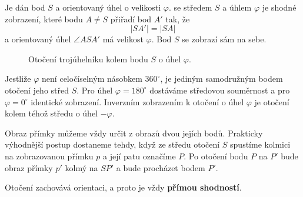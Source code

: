 \documentclass[12pt,a4paper]{article}
\begin{document}
\begin{definitionbox}
    Je dán bod $S$ a orientovaný úhel o velikosti $\varphi$.  se středem $S$ a úhlem $\varphi$ je shodné zobrazení, které bodu $A\neq S$ přiřadí bod $A'$ tak, že
    \[
        |SA'|=|SA|
    \]
    a orientovaný úhel $\angle ASA'$ má velikost $\varphi$. Bod $S$ se zobrazí sám na sebe.
\end{definitionbox}

\begin{figure}[ht]
    \centering
    \caption{Otočení trojúhelníku kolem bodu $S$ o úhel $\varphi$.}
\end{figure}

Jestliže $\varphi$ není celočíselným násobkem $360^\circ$, je jediným samodružným bodem otočení jeho střed $S$. Pro úhel $\varphi=180^\circ$ dostáváme středovou souměrnost a pro $\varphi=0^\circ$ identické zobrazení. Inverzním zobrazením k otočení o úhel $\varphi$ je otočení kolem téhož středu o úhel $-\varphi$.

Obraz přímky můžeme vždy určit z obrazů dvou jejích bodů. Prakticky výhodnější postup dostaneme tehdy, když ze středu otočení $S$ spustíme kolmici na zobrazovanou přímku $p$ a její patu označíme $P$. Po otočení bodu $P$ na $P'$ bude obraz přímky $p'$ kolmý na $SP'$ a bude procházet bodem $P'$.

Otočení zachovává orientaci, a proto je vždy \textbf{přímou shodností}.
\end{document}
